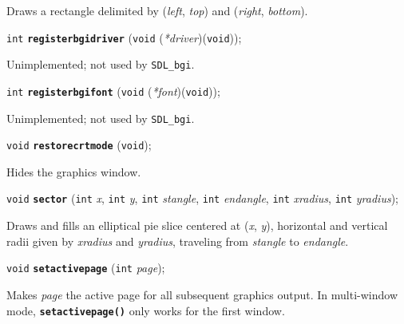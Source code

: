 \documentclass[a4paper,12pt]{article}
\newcommand{\SDLbgi}{\texttt{SDL\_bgi}}
\newcommand{\V}{\texttt{void}}      %
\newcommand{\I}{\texttt{int}}       %
\newcommand{\func}[1]{\textbf{\texttt{#1}}}  %
\newcommand{\A}[1]{\emph{#1}}       %
\newenvironment{bgi}
{ %
  \begin{snugshade}
}
{ %
  \end{snugshade}
}
\begin{document}
Draws a rectangle delimited by (\A{left}, \A{top}) and
(\A{right}, \A{bottom}).


\label{sec:registerbgidriver}

\begin{bgi}
\I{} \func{registerbgidriver} (\V{} (\A{*driver})(\V{}));
\end{bgi}

Unimplemented; not used by \SDLbgi.


\label{sec:registerbgifont}

\begin{bgi}
\I{} \func{registerbgifont} (\V{} (\A{*font})(\V{}));
\end{bgi}

Unimplemented; not used by \SDLbgi.


\label{sec:restorecrtmode}

\begin{bgi}
\V{} \func{restorecrtmode} (\V{});
\end{bgi}

Hides the graphics window.


\label{sec:sector}

\begin{bgi}
\V{} \func{sector} (\I{} \A{x}, \I{} \A{y}, \I{} \A{stangle}, \I{}
\A{endangle}, \I{} \A{xradius}, \I{} \A{yradius});
\end{bgi}

Draws and fills an elliptical pie slice centered at (\A{x}, \A{y}),
horizontal and vertical radii given by \A{xradius} and \A{yradius},
traveling from \A{stangle} to \A{endangle}.


\label{sec:setactivepage}

\begin{bgi}
\V{} \func{setactivepage} (\I{} \A{page});
\end{bgi}

Makes \A{page} the active page for all subsequent graphics output. In
multi-window mode, \func{setactivepage()} only works for the first window.
\end{document}
